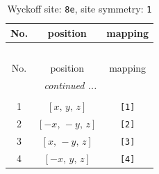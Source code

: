 \documentclass[fleqn,8pt]{jsarticle}
\begin{document}
\begin{longtable}{ccc}
\caption{Wyckoff site: {\tt 8e}, site symmetry: {\tt 1}}
 \\
 \hline \hline
No. & position & mapping \\ \hline \endfirsthead

\multicolumn{2}{l}{\tablename\ \thetable{}} \\
 \hline \hline
No. & position & mapping \\ \hline \endhead

 \hline \hline
\multicolumn{2}{r}{\footnotesize\it continued ...} \\ \endfoot

 \hline \hline
\multicolumn{2}{r}{} \\ \endlastfoot

1 & $\left[ x,\, y,\, z \right]$ & {\tt [1]} \\ \hline
2 & $\left[ - x,\, - y,\, z \right]$ & {\tt [2]} \\ \hline
3 & $\left[ x,\, - y,\, z \right]$ & {\tt [3]} \\ \hline
4 & $\left[ - x,\, y,\, z \right]$ & {\tt [4]} \\
\end{longtable}
\end{document}
